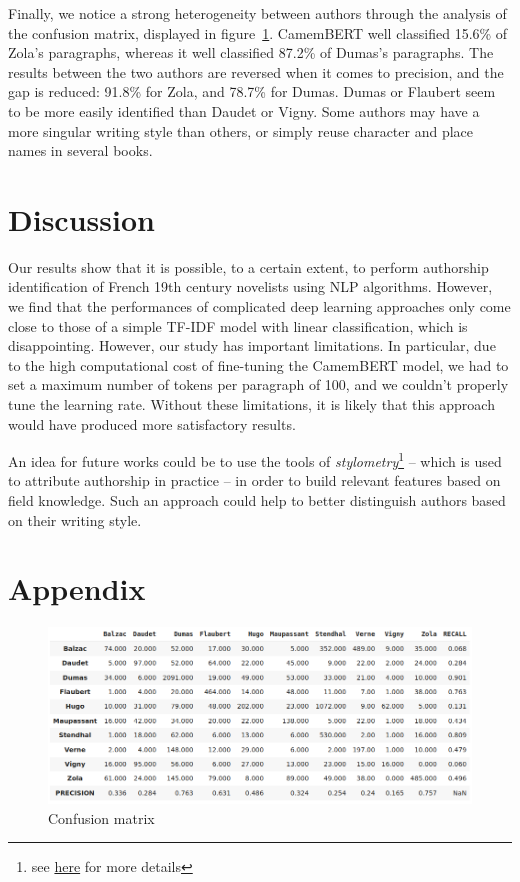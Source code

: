 \documentclass[11pt,a4paper]{article}
\begin{document}
Finally, we notice a strong heterogeneity between authors through the analysis of the confusion matrix, displayed in figure~\ref{conf_matrix}. CamemBERT well classified 15.6\% of Zola's paragraphs, whereas it well classified 87.2\% of Dumas's paragraphs. The results between the two authors are reversed when it comes to precision, and the gap is reduced: 91.8\% for Zola, and 78.7\% for Dumas. Dumas or Flaubert seem to be more easily identified than Daudet or Vigny. Some authors may have a more singular writing style than others, or simply reuse character and place names in several books.


\section{Discussion}

Our results show that it is possible, to a certain extent, to perform authorship identification of French 19th century novelists using NLP algorithms. However, we find that the performances of complicated deep learning approaches only come close  to those of a simple TF-IDF model with linear classification, which is disappointing. However, our study has important limitations. In particular, due to the high computational cost of fine-tuning the CamemBERT model, we had to set a maximum number of tokens per paragraph of 100, and we couldn't properly tune the learning rate. Without these limitations, it is likely that this approach would have produced more satisfactory results.

An idea for future works could be to use the tools of \textit{stylometry}\footnote{see \href{https://en.wikipedia.org/wiki/Stylometry}{here} for more details} -- which is used to attribute authorship in practice -- in order to build relevant features based on field knowledge. Such an approach could help to better distinguish authors based on their writing style.







\newpage




\bigskip

\section*{Appendix}

\begin{figure}[h]
\caption{Confusion matrix}
\label{conf_matrix}
\includegraphics[scale=0.5]{figures/confusion.png}
\end{figure}
\end{document}
